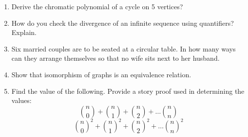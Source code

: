 \documentclass{article}
\begin{document}
\begin{enumerate}
  \item Derive the chromatic polynomial of a cycle on 5 vertices? 


 \item How do you check the divergence of an infinite sequence using quantifiers? Explain.
 
  \item Six married couples are to be seated at a circular table. In how many ways can they arrange themselves so that no wife sits next to her husband.

\item Show that isomorphism of graphs is an equivalence relation.

\item Find the value of the following. Provide a story proof used in determining the values:
\begin{equation}
{n \choose 0} + {n \choose 1} + {n \choose 2} + \dots {n \choose n}
\end{equation}
\begin{equation}
{n \choose 0}^2 + {n \choose 1}^2 + {n \choose 2}^2 + \dots {n \choose n}^2
\end{equation}

\end{enumerate}
\vspace*{3cm}
\end{document}
